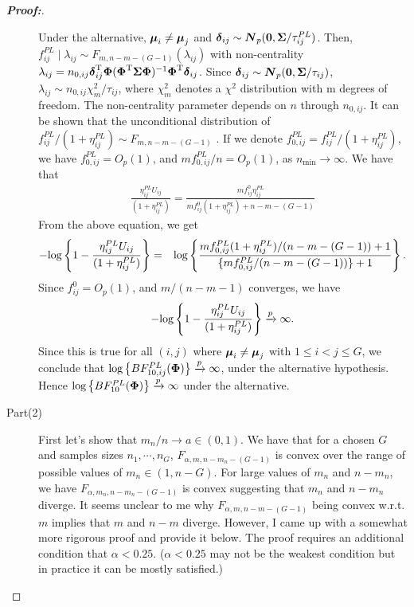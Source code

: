 \documentclass[times,sort&compress,3p]{elsarticle}
\theoremstyle{plain}%
\theoremstyle{definition}
\def\log{\hbox{log}}
\def\log{\hbox{log}}
\def\bse{\begin{eqnarray*}}
\def\ese{\end{eqnarray*}}
\def\be{\begin{eqnarray}}
\def\ee{\end{eqnarray}}
\def\trans{^{\rm T}}
\newcommand{\uN}       {\mbox{\boldmath$N$}}
\newcommand{\udelta}            {\mbox{\boldmath$\delta$}}
\newcommand{\umu}               {\mbox{\boldmath$\mu$}}
\newcommand{\uSigma}            {\mbox{\boldmath$\Sigma$}}
\newcommand{\uPhi}              {\mbox{\boldmath$\Phi$}}
\begin{document}
\begin{proof}[\textbf{\upshape Proof:}]
\begin{description}
Under the alternative, $\umu_{i} \neq \umu_{j}$ and $\udelta_{ij} \sim \uN_{p}({\bf 0}, \uSigma /\tau^{PL}_{ij})$.
Then, $f_{ij}^{PL} \mid   \lambda_{ij} \sim F_{m, n-m-(G-1)}(\lambda_{ij})$
with non-centrality $\lambda_{ij} = n_{0,ij}\udelta_{ij}\trans\uPhi(\uPhi\trans \uSigma \uPhi)^{-1}\uPhi\trans \udelta_{ij}$.
Since $\udelta_{ij} \sim \uN_{p}({\bf 0}, \uSigma /\tau_{ij})$, $\lambda_{ij} \sim n_{0,ij}\chi_{m}^{2}/\tau_{ij}$,
where $\chi_{m}^{2}$ denotes a $\chi^{2}$ distribution with m degrees of freedom. The non-centrality parameter depends on $n$ through $n_{0,ij}$.
It can be shown that the unconditional distribution of $f_{ij}^{PL} /(1 + \eta^{PL}_{ij}) \sim F_{m, n-m-(G-1)}$ \citep[see for reference][page 704]{johnson2005bayes}.
If we denote $f_{0,ij}^{PL} =  f_{ij}^{PL} /(1 + \eta^{PL}_{ij})$, we have $f^{PL}_{0,ij} = O_{p}(1)$, and $mf_{0,ij}^{PL}/n = O_{p}(1)$, as $n_{\min} \rightarrow \infty$.
We have that
\be
\frac{\eta^{PL}_{ij} U_{ij}}{(1+\eta^{PL}_{ij})} = \frac{ m f_{ij}^{0}\eta^{PL}_{ij}}{m f_{ij}^{0}(1+\eta^{PL}_{ij})+n-m-(G-1)} \nonumber
\ee
From the above equation, we get
\be
-\log\left\{ 1 - \frac{\eta^{PL}_{ij} U_{ij}}{(1+\eta^{PL}_{ij})} \right \} &=& \log\left\{ \frac{mf_{0,ij}^{PL}(1+\eta^{PL}_{ij})/(n-m-(G-1)) + 1}{\{mf_{0,ij}^{PL}/(n-m-(G-1))\} +1 }\right\}. \nonumber
\ee
Since $f_{ij}^{0} = O_{p}(1)$, and $m/(n-m-1)$ converges, we have
\bse
 -\log\left\{ 1 - \frac{\eta^{PL}_{ij} U_{ij}}{(1+\eta^{PL}_{ij})} \right \} \xrightarrow[]{p} \infty.
\ese
Since this is true for all $(i,j)$ where $\umu_i \neq \umu_j$ with $1 \leq i < j \leq G$, we conclude that $\log\left\{BF^{PL}_{10,ij}(\uPhi) \right \} \xrightarrow[]{p} \infty$, under the alternative hypothesis. Hence $\log\left\{BF^{PL}_{10}(\uPhi) \right \} \xrightarrow[]{p} \infty$ under the alternative. 

\item[Part(2)] First let's show that $m_n/n \rightarrow a \in (0, 1)$. 
We have that for a chosen $G$ and samples sizes $n_1, \cdots, n_{G}$,  $F_{\alpha, m, n-m_n-(G-1)}$ is convex over the range of possible values of $m_n \in (1, n-G)$. For large values of $m_n$ and $n - m_n$, we have $F_{\alpha, m_n, n-m_n-(G-1)}$ is convex suggesting that $m_n$ and $n-m_n$ diverge. {\color{blue}It seems unclear to me why $F_{\alpha, m, n - m - (G - 1)}$ being convex w.r.t. $m$ implies that $m$ and $n - m$ diverge. However, I came up with a somewhat more rigorous proof and provide it below. The proof requires an additional condition that $\alpha < 0.25$. ($\alpha < 0.25$ may not be the weakest condition but in practice it can be mostly satisfied.)}


\end{description}
\end{proof}
\end{document}
